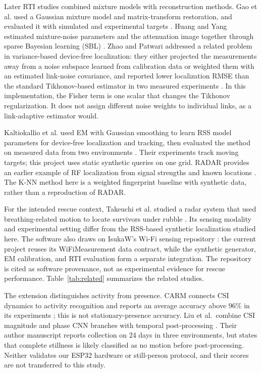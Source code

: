 \documentclass[sensors,article,submit,oneauthor]{Definitions/mdpi}
\begin{document}
Later RTI studies combined mixture models with reconstruction methods. Gao et al. used a Gaussian mixture model and matrix-transform restoration, and evaluated it with simulated and experimental targets \cite{Gao2017}. Huang and Yang estimated mixture-noise parameters and the attenuation image together through sparse Bayesian learning (SBL) \cite{Huang2020}. Zhao and Patwari addressed a related problem in variance-based device-free localization: they either projected the measurements away from a noise subspace learned from calibration data or weighted them with an estimated link-noise covariance, and reported lower localization RMSE than the standard Tikhonov-based estimator in two measured experiments \cite{Zhao2011}. In this implementation, the Fisher term is one scalar that changes the Tikhonov regularization. It does not assign different noise weights to individual links, as a link-adaptive estimator would.

Kaltiokallio et al. used EM with Gaussian smoothing to learn RSS model parameters for device-free localization and tracking, then evaluated the method on measured data from two environments \cite{Kaltiokallio2021}. Their experiments track moving targets; this project uses static synthetic queries on one grid. RADAR provides an earlier example of RF localization from signal strengths and known locations \cite{Bahl2000}. The K-NN method here is a weighted fingerprint baseline with synthetic data, rather than a reproduction of RADAR.

For the intended rescue context, Takeuchi et al. studied a radar system that used breathing-related motion to locate survivors under rubble \cite{Takeuchi2008}. Its sensing modality and experimental setting differ from the RSS-based synthetic localization studied here. The software also draws on IsukaW's Wi-Fi sensing repository \cite{IsukaW}: the current project reuses its WiFiMeasurement data contract, while the synthetic generator, EM calibration, and RTI evaluation form a separate integration. The repository is cited as software provenance, not as experimental evidence for rescue performance. Table~\ref{tab:related} summarizes the related studies.

The extension distinguishes activity from presence. CARM connects CSI dynamics to activity recognition and reports an average accuracy above 96\% in its experiments \cite{Wang2015CARM}; this is not stationary-presence accuracy. Liu et al.\ combine CSI magnitude and phase CNN branches with temporal post-processing \cite{Liu2022Presence}. Their author manuscript reports collection on 24 days in three environments, but states that complete stillness is likely classified as no motion before post-processing. Neither validates our ESP32 hardware or still-person protocol, and their scores are not transferred to this study.
\end{document}
